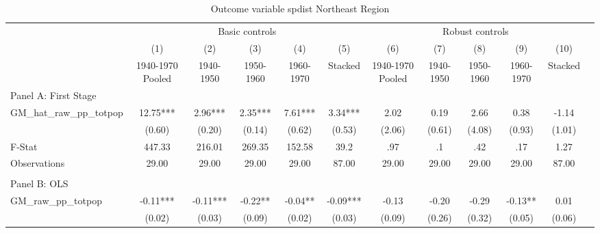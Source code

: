  \begin{table}[htbp]\centering {} \begin{threeparttable} \caption{Outcome variable spdist Northeast Region} \begin{tabular}{l*{11}{c}} \toprule
          &\multicolumn{5}{c}{Basic controls}                                   &\multicolumn{5}{c}{Robust controls}                                  \\\cmidrule(lr){2-6}\cmidrule(lr){7-11}
          &\multicolumn{1}{c}{(1)}&\multicolumn{1}{c}{(2)}&\multicolumn{1}{c}{(3)}&\multicolumn{1}{c}{(4)}&\multicolumn{1}{c}{(5)}&\multicolumn{1}{c}{(6)}&\multicolumn{1}{c}{(7)}&\multicolumn{1}{c}{(8)}&\multicolumn{1}{c}{(9)}&\multicolumn{1}{c}{(10)}\\
          &\multicolumn{1}{c}{1940-1970 Pooled}&\multicolumn{1}{c}{1940-1950}&\multicolumn{1}{c}{1950-1960}&\multicolumn{1}{c}{1960-1970}&\multicolumn{1}{c}{Stacked}&\multicolumn{1}{c}{1940-1970 Pooled}&\multicolumn{1}{c}{1940-1950}&\multicolumn{1}{c}{1950-1960}&\multicolumn{1}{c}{1960-1970}&\multicolumn{1}{c}{Stacked}\\
\cmidrule(lr){1-11}
\multicolumn{10}{l}{Panel A: First Stage}\\
\cmidrule(lr){1-11}
GM\_hat\_raw\_pp\_totpop&     12.75***&      2.96***&      2.35***&      7.61***&      3.34***&      2.02   &      0.19   &      2.66   &      0.38   &     -1.14   \\
          &    (0.60)   &    (0.20)   &    (0.14)   &    (0.62)   &    (0.53)   &    (2.06)   &    (0.61)   &    (4.08)   &    (0.93)   &    (1.01)   \\
\midrule
F-Stat    &    447.33   &    216.01   &    269.35   &    152.58   &      39.2   &       .97   &        .1   &       .42   &       .17   &      1.27   \\
Observations&     29.00   &     29.00   &     29.00   &     29.00   &     87.00   &     29.00   &     29.00   &     29.00   &     29.00   &     87.00   \\
\cmidrule[\heavyrulewidth](lr){1-11} \\ \cmidrule[\heavyrulewidth](lr){1-11}
\multicolumn{10}{l}{Panel B: OLS}\\
\cmidrule(lr){1-11}
GM\_raw\_pp\_totpop&     -0.11***&     -0.11***&     -0.22** &     -0.04** &     -0.09***&     -0.13   &     -0.20   &     -0.29   &     -0.13** &      0.01   \\
          &    (0.02)   &    (0.03)   &    (0.09)   &    (0.02)   &    (0.03)   &    (0.09)   &    (0.26)   &    (0.32)   &    (0.05)   &    (0.06)   \\

\end{tabular}
\end{threeparttable}
\end{table}
